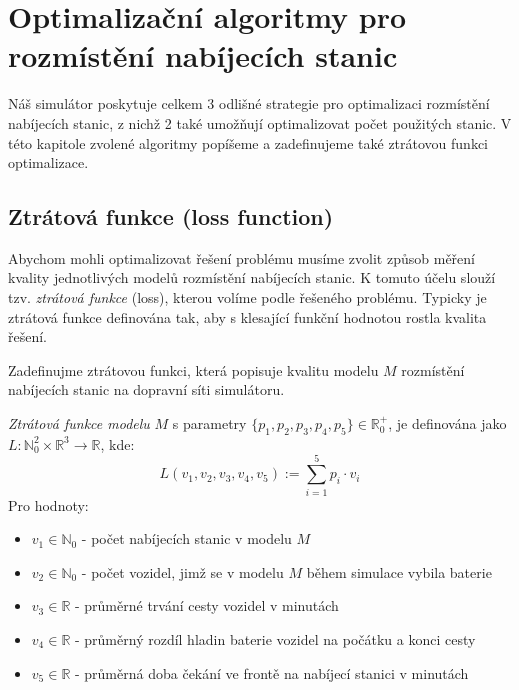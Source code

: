 \chapter{Optimalizační algoritmy pro rozmístění nabíjecích stanic}
\label{chap:optim}

Náš simulátor poskytuje celkem 3 odlišné strategie pro optimalizaci rozmístění
nabíjecích stanic, z nichž 2 také umožňují optimalizovat počet použitých stanic.
V této kapitole zvolené algoritmy popíšeme a zadefinujeme také ztrátovou funkci
optimalizace.


\section{Ztrátová funkce (loss function)}
\label{sec:loss}

Abychom mohli optimalizovat řešení problému musíme zvolit způsob měření 
kvality jednotlivých modelů rozmístění nabíjecích stanic. K tomuto účelu slouží tzv. 
\emph{ztrátová funkce} (loss), kterou volíme podle řešeného problému.
Typicky je ztrátová funkce definována tak, aby s klesající funkční hodnotou 
rostla kvalita řešení.

Zadefinujme ztrátovou funkci, která popisuje kvalitu modelu $M$ rozmístění nabíjecích
stanic na dopravní síti simulátoru.

\begin{defn}\label{def:loss}
    \emph{Ztrátová funkce modelu} $M$ s parametry
    $\{p_1, p_2, p_3, p_4, p_5\} \in \mathbb{R}^+_0$, je definována jako
    $L:\mathbb{N}_0^2 \times \mathbb{R}^3 \to \mathbb{R}$, kde:
        $$L(v_1, v_2, v_3, v_4, v_5) := \sum_{i=1}^5 p_i \cdot v_i$$
    Pro hodnoty:
    \begin{itemize}
        \item $v_1 \in \mathbb{N}_0$ - počet nabíjecích stanic v modelu $M$
        \item $v_2 \in \mathbb{N}_0$ - počet vozidel, jimž se v modelu $M$ během simulace vybila baterie
        \item $v_3 \in \mathbb{R}$ - průměrné trvání cesty vozidel v minutách
        \item $v_4 \in \mathbb{R}$ - průměrný rozdíl hladin baterie vozidel na počátku a konci cesty
        \item $v_5 \in \mathbb{R}$ - průměrná doba čekání ve frontě na nabíjecí stanici v minutách
    \end{itemize}
\end{defn}


